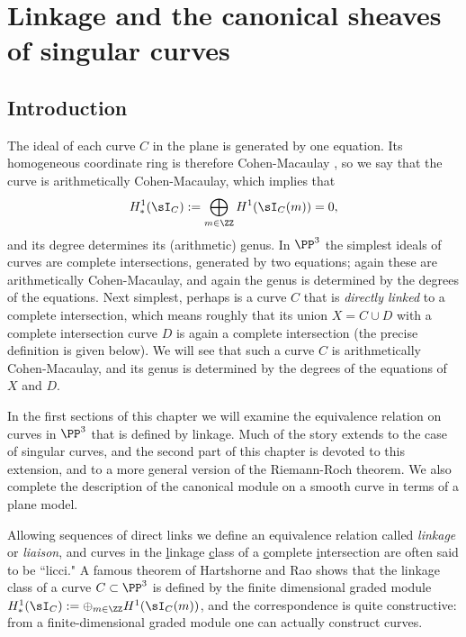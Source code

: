 

\chapter{Linkage and the canonical sheaves of singular curves}
\label{LiaisonChapter}\label{linkageChapter}\label{LinkageChapter}


\section{Introduction} 


The ideal of each curve $C$ in the plane is generated by one equation. Its homogeneous coordinate ring
is therefore Cohen-Macaulay \cite[****]{Eisenbud1995}, so we say that the curve is arithmetically Cohen-Macaulay, 
which implies that 
$$
H^1_*(\sI_C) := \bigoplus_{m\in \ZZ}H^1(\sI_C(m)) = 0,
$$
 and its degree determines its (arithmetic) genus. In $\PP^3$ the simplest ideals of curves are
complete intersections, generated by two equations; again these are arithmetically Cohen-Macaulay, and again the genus is determined by the degrees of the equations.
 Next simplest, perhaps
is a curve $C$ that is \emph{directly linked} to a complete intersection, which means roughly that its union $X = C\cup D$
with a complete intersection
curve $D$ is again a complete intersection (the precise definition is given below). We will see that such a curve $C$ is arithmetically Cohen-Macaulay,
and its genus is determined by the degrees of the equations of $X$ and $D$. 

In the first sections of this chapter we will examine the equivalence relation on curves in $\PP^3$ that is defined by linkage. Much of the story extends to the case of singular curves, and the second part of this chapter is devoted to this extension, and to a more general version of the Riemann-Roch theorem. We also complete the description of the canonical module on a smooth curve
in terms of a plane model.

Allowing sequences of direct links we define an equivalence relation called  \emph{linkage} or \emph{liaison}, 
and curves in the {\underline l}inkage {\underline c}lass of a {\underline c}omplete {\underline i}ntersection are often said to be ``licci." 
A famous theorem of Hartshorne and Rao \cite{MR520926} shows that the linkage class of a curve $C\subset \PP^3$
is defined by the finite dimensional graded module $H^1_*(\sI_C):=\oplus_{m\in \ZZ} H^1(\sI_C(m))$,
and the correspondence is quite constructive: from a finite-dimensional graded module one can
actually construct curves.

